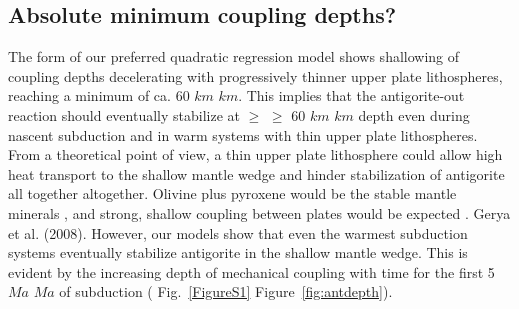 \documentclass[draft,linenumbers]{agujournal2018} %
\providecommand{\DIFaddtex}[1]{{\protect\color{blue} \sf #1}} %
\providecommand{\DIFdeltex}[1]{{\protect\color{red} \scriptsize #1}} %
\providecommand{\DIFaddbegin}{} %
\providecommand{\DIFaddend}{} %
\providecommand{\DIFdelbegin}{} %
\providecommand{\DIFdelend}{} %
\providecommand{\DIFadd}[1]{\texorpdfstring{\DIFaddtex{#1}}{#1}} %
\providecommand{\DIFdel}[1]{\texorpdfstring{\DIFdeltex{#1}}{}} %
\newcommand{\DIFscaledelfig}{0.3}
\newlength{\DIFdelgraphicswidth} %
\newlength{\DIFdelgraphicsheight} %
\newcommand{\DIFaddincludegraphics}[2][]{{\color{blue}\fbox{\DIFOincludegraphics[#1]{#2}}}} %
\newcommand{\DIFdelincludegraphics}[2][]{%
\sbox{\DIFdelgraphicsbox}{\DIFOincludegraphics[#1]{#2}}%
\settoboxwidth{\DIFdelgraphicswidth}{\DIFdelgraphicsbox} %
\settoboxtotalheight{\DIFdelgraphicsheight}{\DIFdelgraphicsbox} %
\scalebox{\DIFscaledelfig}{%
\parbox[b]{\DIFdelgraphicswidth}{\usebox{\DIFdelgraphicsbox}\\[-\baselineskip] \rule{\DIFdelgraphicswidth}{0em}}\llap{\resizebox{\DIFdelgraphicswidth}{\DIFdelgraphicsheight}{%
\setlength{\unitlength}{\DIFdelgraphicswidth}%
\begin{picture}(1,1)%
\thicklines\linethickness{2pt} %
{\color[rgb]{1,0,0}\put(0,0){\framebox(1,1){}}}%
{\color[rgb]{1,0,0}\put(0,0){\line( 1,1){1}}}%
{\color[rgb]{1,0,0}\put(0,1){\line(1,-1){1}}}%
\end{picture}%
}\hspace*{3pt}}} %
} %
\DeclareRobustCommand{\DIFaddbegin}{\DIFOaddbegin \let\includegraphics\DIFaddincludegraphics} %
\DeclareRobustCommand{\DIFaddend}{\DIFOaddend \let\includegraphics\DIFOincludegraphics} %
\DeclareRobustCommand{\DIFdelbegin}{\DIFOdelbegin \let\includegraphics\DIFdelincludegraphics} %
\DeclareRobustCommand{\DIFdelend}{\DIFOaddend \let\includegraphics\DIFOincludegraphics} %
\begin{document}
\clearpage

\subsection{\DIFadd{Absolute minimum coupling depths?}}

\DIFaddend The form of our preferred quadratic regression model shows shallowing of
coupling depths decelerating with progressively thinner upper plate
lithospheres, reaching a minimum of ca. 60 \DIFdelbegin \DIFdel{$km$}\DIFdelend \DIFaddbegin \DIFadd{\(km\)}\DIFaddend . This implies that the
antigorite-out reaction should eventually stabilize at \DIFdelbegin \DIFdel{$\geq$ }\DIFdelend \DIFaddbegin \DIFadd{\(\geq\) }\DIFaddend 60
\DIFdelbegin \DIFdel{$km$ }\DIFdelend \DIFaddbegin \DIFadd{\(km\) }\DIFaddend depth even during nascent subduction and in warm systems with
thin upper plate lithospheres. From a theoretical point of view, a thin
upper plate lithosphere could allow high heat transport to the shallow
mantle wedge and hinder stabilization of antigorite \DIFdelbegin \DIFdel{all together}\DIFdelend \DIFaddbegin \DIFadd{altogether}\DIFaddend . Olivine
plus pyroxene would be the stable mantle minerals\DIFaddbegin \DIFadd{, }\DIFaddend and strong, shallow
coupling between plates would be expected \DIFdelbegin %
\DIFdel{. }\DIFdelend \DIFaddbegin \DIFadd{Gerya et al. (2008). }\DIFaddend However,
our models show that even the warmest subduction systems eventually
stabilize antigorite in the shallow mantle wedge. This is evident by the
increasing depth of mechanical coupling with time for the first 5 \DIFdelbegin \DIFdel{$Ma$ }\DIFdelend \DIFaddbegin \DIFadd{\(Ma\)
}\DIFaddend of subduction (\DIFdelbegin \DIFdel{Fig.~\ref{FigureS1}}\DIFdelend \DIFaddbegin \DIFadd{Figure~\ref{fig:antdepth}}\DIFaddend ).
\end{document}
